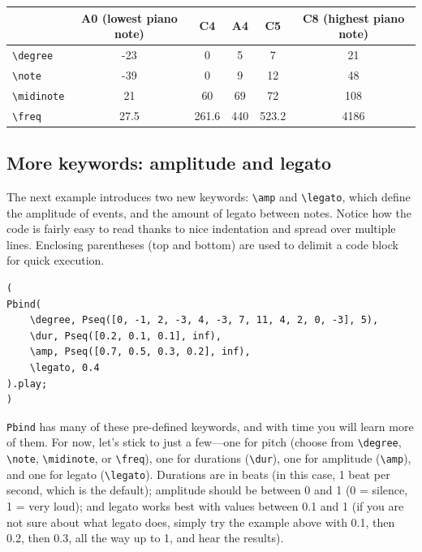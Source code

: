 \bigskip
{}
\bigskip


\begin{tabular}{|l|c|c|c|c|c|}
\hline 
  & \textbf{A0 (lowest piano note)} & \textbf{C4} & \textbf{A4} & \textbf{C5} & \textbf{C8 (highest piano note)} \\ 
\hline 
\texttt{\textbackslash degree} & -23 & 0 & 5 & 7 & 21 \\
\hline
\texttt{\textbackslash note} & -39 & 0 & 9 & 12 & 48 \\
\hline
\texttt{\textbackslash midinote} & 21 & 60 & 69 & 72 & 108 \\
\hline
\texttt{\textbackslash freq} & 27.5 & 261.6 & 440 & 523.2 & 4186 \\
\hline
\end{tabular}
\bigskip


\subsection{More keywords: amplitude and legato}

The next example introduces two new keywords: \texttt{\textbackslash amp} and \texttt{\textbackslash legato}, which define the amplitude of events, and the amount of legato between notes. Notice how the code is fairly easy to read thanks to nice indentation and spread over multiple lines. Enclosing parentheses (top and bottom) are used to delimit a code block for quick execution.

 
\begin{lstlisting}[style=SuperCollider-IDE, basicstyle=\scttfamily\footnotesize]
(
Pbind(
	\degree, Pseq([0, -1, 2, -3, 4, -3, 7, 11, 4, 2, 0, -3], 5),
	\dur, Pseq([0.2, 0.1, 0.1], inf),
	\amp, Pseq([0.7, 0.5, 0.3, 0.2], inf),
	\legato, 0.4
).play;
)
\end{lstlisting}
 

\texttt{Pbind} has many of these pre-defined keywords, and with time you will learn more of them. For now, let's stick to just a few---one for pitch (choose from \texttt{\textbackslash degree}, \texttt{\textbackslash note}, \texttt{\textbackslash midinote}, or \texttt{\textbackslash freq}), one for durations (\texttt{\textbackslash dur}), one for amplitude (\texttt{\textbackslash amp}), and one for legato  (\texttt{\textbackslash legato}). Durations are in beats (in this case, 1 beat per second, which is the default); amplitude should be between 0 and 1 (0 = silence, 1 = very loud); and legato works best with values between 0.1 and 1 (if you are not sure about what legato does, simply try the example above with 0.1, then 0.2, then 0.3, all the way up to 1, and hear the results).

